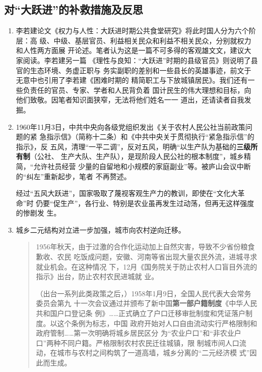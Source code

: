 \subsection{对“大跃进”的补救措施及反思}

\begin{enumerate}

\item 李若建论文《权力与人性：大跃进时期公共食堂研究》将此时国人分为六个阶层：高
  级、中级、基层官员、利益相关民众和利益不相关民众，分别就权力和人性两方面展
  开论述。笔者认为这是一篇不可多得的客观雄文文，建议大家阅读。李若建另一篇
  《理性与良知：“大跃进”时期的县级官员》则说明了县官的生态环境、务虚正职与
  务实副职的差别和一些县长的英雄事迹，前文于无意中也引用了李若建《困难时期的
  精简职工与下放城镇居民》。我们还有一些负责任的官员、专家、学者和人民背负着
  国计民生的伟大理想和目标，向他们致敬。因笔者知识面狭窄，无法将他们姓名一一
  道出，还请读者自我发掘。

\item 1960年11月3日，中共中央向各级党组织发出《关于农村人民公社当前政策问题的紧
  急指示信》（简称十二条）和《中共中央关于贯彻执行“紧急指示信”的指示》，反
  五风，清理“一平二调”，反对五风，明确“以生产队为基础的\textbf{三级所有制}（公社、
  生产大队、生产队），是现阶段人民公社的根本制度”，城乡精简，“允许社员经营
  少量的自留地和小规模的家庭副业”等。被庐山会议中断的“纠左”重新起步，笔者
  不再赘述。

  经过“五风大跃进”，国家吸取了蔑视客观生产力的教训，即使在“文化大革命”时
  仍要“促生产”，各行业、特别是农业虽再发生过动荡，但再无这样强度的惨剧发
  生。


\item 城乡二元结构对立进一步加强，城市向农村逆向迁移。

  \begin{quotation}
    1956年秋天，由于过激的合作化运动加上自然灾害，导致不少省份粮食歉收、农民
    吃饭成问题，安徽、河南等省出现大量农民外流，进城寻求就业机会。在这种情况
    下，12月《国务院关于防止农村人口盲目外流的指示》出台，防止农村农民进城就
    业。

    （出台一系列此类政策之后，）1958年1月9日，全国人民代表大会常务委员会第九
    十一次会议通过并颁布了新中国\textbf{第一部户籍制度}《中华人民共和国户口登记条
    例》……正式确立了户口迁移审批制度和凭证落户制度。以这个条例为标志，中国
    政府开始对人口自由流动实行严格限制和政府管制……第一次明确将城乡居民区分
    为“农业户口”和“非农业户口”两种不同户籍。严格限制农村农民迁往城镇，限
    制城市间人口流动，在城市与农村之间构筑了一道高墙，城乡分离的“二元经济模
    式”因此而生成。


\end{quotation}
\end{enumerate}
